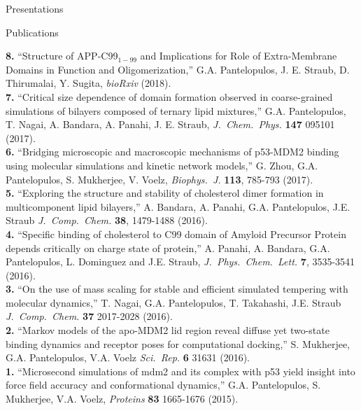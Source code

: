 \documentclass[a4paper]{article}
\def\jcc{\it J.~Comp.~Chem.}
\def\jpcl{\it J.~Phys.~Chem.~Lett.}
\def\prot{\it Proteins}
\def\jcp{\it J.~Chem.~Phys.}
\def\bj{\it Biophys.~J.}
\def\jpcl{\it J.~Phys.~Chem.~Lett.}
\def\scirep{\it Sci.~Rep.}
\begin{document}
\begin{rubrique}{Presentations}
\end{rubrique}

\begin{rubrique}{Publications}
\end{rubrique}

{\bf 8.} ``Structure of APP-C99$_{1-99}$ and Implications for Role of Extra-Membrane Domains in Function and Oligomerization,'' G.A. Pantelopulos, J. E. Straub, D. Thirumalai, Y. Sugita, \textit{bioRxiv} (2018). \\
{\bf 7.} ``Critical size dependence of domain formation observed in coarse-grained simulations of bilayers composed of ternary lipid mixtures,'' G.A. Pantelopulos, T. Nagai, A. Bandara, A. Panahi, J. E. Straub, {\jcp} {\bf 147} 095101 (2017). \\
{\bf 6.} ``Bridging microscopic and macroscopic mechanisms of p53-MDM2 binding using molecular simulations and kinetic network models,'' G. Zhou, G.A. Pantelopulos, S. Mukherjee, V. Voelz, {\bj} {\bf 113},  785-793 (2017). \\
{\bf 5.} ``Exploring the structure and stability of cholesterol dimer formation in multicomponent lipid bilayers,'' A. Bandara, A. Panahi, G.A. Pantelopulos, J.E. Straub {\jcc} {\bf 38}, 1479-1488 (2016). \\
{\bf 4.}  ``Specific binding of cholesterol to C99 domain of Amyloid Precursor Protein depends critically on charge state of protein,'' A. Panahi, A. Bandara, G.A. Pantelopulos, L. Dominguez and J.E. Straub, {\jpcl} {\bf 7}, 3535-3541 (2016). \\
{\bf 3.} ``On the use of mass scaling for stable and efficient simulated tempering with molecular dynamics,'' T. Nagai, G.A. Pantelopulos, T. Takahashi, J.E. Straub {\jcc} {\bf 37} 2017-2028 (2016). \\
{\bf 2.} ``Markov models of the apo-MDM2 lid region reveal diffuse yet two-state binding dynamics and receptor poses for computational docking,'' S. Mukherjee, G.A. Pantelopulos, V.A. Voelz {\scirep} {\bf 6} 31631 (2016). \\
{\bf 1.} ``Microsecond simulations of mdm2 and its complex with p53 yield insight into force field accuracy and conformational dynamics,'' G.A. Pantelopulos, S. Mukherjee, V.A. Voelz, {\prot} {\bf 83} 1665-1676 (2015).
\end{document}
